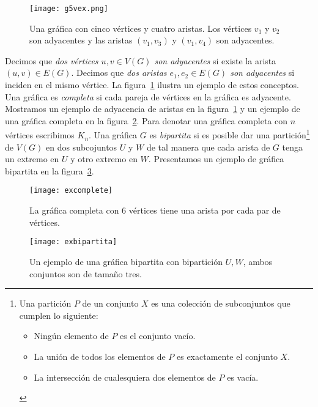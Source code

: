 \begin{figure}[t]
  \centering
  \texttt{[image: g5vex.png]}
  \caption{Una gráfica con cinco vértices y cuatro aristas. Los vértices $v_1$ y $v_2$
  son adyacentes y las aristas $(v_1,v_3)$ y $(v_1,v_4)$ son adyacentes.}
  \label{fig:g5vex}
\end{figure}
Decimos que \emph{dos vértices $u,v\in V(G)$ son adyacentes} si existe la arista
$(u,v)\in E(G)$. Decimos que \emph{dos aristas $e_1,e_2 \in E(G)$ son adyacentes}
si inciden en el mismo vértice. La figura~\ref{fig:g5vex} ilustra
un ejemplo de estos conceptos.
Una gráfica es \emph{completa} si cada pareja de vértices
en la gráfica es adyacente. Mostramos un ejemplo de adyacencia de
aristas en la figura~\ref{fig:g5vex} y un ejemplo de una gráfica completa en la figura~\ref{fig:excomplete}.
Para denotar una gráfica completa con $n$
vértices escribimos $K_n$. Una gráfica $G$ es \emph{bipartita} si es posible
dar una partición\footnote{Una partición $P$ de un conjunto $X$ es
una colección de subconjuntos que cumplen lo siguiente:
\begin{itemize}
\item Ningún elemento de $P$ es el conjunto vacío.
\item La unión de todos los elementos de $P$ es exactamente el conjunto $X$.
\item La intersección de cualesquiera dos elementos de $P$ es vacía.
\end{itemize} }
de $V(G)$ en dos subcojuntos $U$ y $W$ de tal manera que cada
arista de $G$ tenga un extremo en $U$ y otro extremo en $W$. Presentamos
un ejemplo de gráfica bipartita en la figura~\ref{fig:exbipar}.
\begin{figure}[htb]
  \centering
  \texttt{[image: excomplete]}
  \caption{La gráfica completa con 6 vértices tiene una arista por cada par de vértices.}
  \label{fig:excomplete}
\end{figure}
\begin{figure}[h]
  \centering
  \texttt{[image: exbipartita]}
  \caption{Un ejemplo de una gráfica bipartita con bipartición $U, W$, ambos conjuntos son de tamaño tres.}
  \label{fig:exbipar}
\end{figure}

